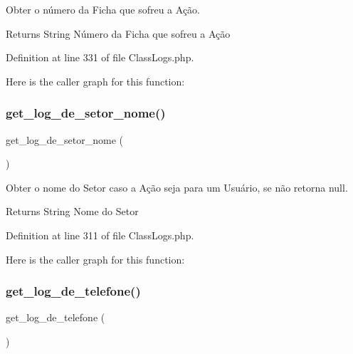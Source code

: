 Obter o número da Ficha que sofreu a Ação. 

\begin{DoxyReturn}{Returns}
String Número da Ficha que sofreu a Ação 
\end{DoxyReturn}


Definition at line 331 of file Class\+Logs.\+php.

Here is the caller graph for this function\+:
\mbox{\label{class_class_logs_a2d4010eed611f258da9452e07166f475}} 
\subsubsection{\texorpdfstring{get\+\_\+log\+\_\+de\+\_\+setor\+\_\+nome()}{get\_log\_de\_setor\_nome()}}
{\footnotesize\ttfamily get\+\_\+log\+\_\+de\+\_\+setor\+\_\+nome (\begin{DoxyParamCaption}{ }\end{DoxyParamCaption})}



Obter o nome do Setor caso a Ação seja para um Usuário, se não retorna null. 

\begin{DoxyReturn}{Returns}
String Nome do Setor 
\end{DoxyReturn}


Definition at line 311 of file Class\+Logs.\+php.

Here is the caller graph for this function\+:
\mbox{\label{class_class_logs_ac099cce47c31507d7c68b27af923cabd}} 
\subsubsection{\texorpdfstring{get\+\_\+log\+\_\+de\+\_\+telefone()}{get\_log\_de\_telefone()}}
{\footnotesize\ttfamily get\+\_\+log\+\_\+de\+\_\+telefone (\begin{DoxyParamCaption}{ }\end{DoxyParamCaption})}



